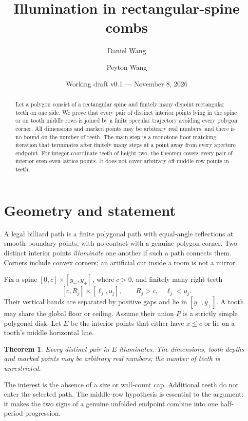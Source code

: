 \documentclass[11pt]{article}
\title{Illumination in rectangular-spine combs}
\author{Daniel Wang \and Peyton Wang}
\date{Working draft v0.1 --- November 8, 2026}
\newtheorem{theorem}{Theorem}[section]
\theoremstyle{definition}
\begin{document}
\maketitle
\begin{abstract}
Let a polygon consist of a rectangular spine and finitely many disjoint rectangular teeth on one side. We prove that every pair of distinct interior points lying in the spine or on tooth middle rows is joined by a finite specular trajectory avoiding every polygon corner. All dimensions and marked points may be arbitrary real numbers, and there is no bound on the number of teeth. The main step is a monotone floor-matching iteration that terminates after finitely many steps at a point away from every aperture endpoint. For integer-coordinate teeth of height two, the theorem covers every pair of interior even-even lattice points. It does not cover arbitrary off-middle-row points in teeth.
\end{abstract}

\section{Geometry and statement}
A legal billiard path is a finite polygonal path with equal-angle reflections at smooth boundary points, with no contact with a genuine polygon corner. Two distinct interior points \emph{illuminate} one another if such a path connects them. Corners include convex corners; an artificial cut inside a room is not a mirror.

Fix a spine $[0,c]\times[y_-,y_+]$, where $c>0$, and finitely many right teeth
\[
 [c,R_j]\times[\ell_j,u_j],\qquad R_j>c,\quad \ell_j<u_j.
\]
Their vertical bands are separated by positive gaps and lie in $[y_-,y_+]$. A tooth may share the global floor or ceiling. Assume their union $P$ is a strictly simple polygonal disk. Let $E$ be the interior points that either have $x\le c$ or lie on a tooth's middle horizontal line.

\begin{theorem}\label{thm:comb}
Every distinct pair in $E$ illuminates. The dimensions, tooth depths and marked points may be arbitrary real numbers; the number of teeth is unrestricted.
\end{theorem}

The interest is the absence of a size or wall-count cap. Additional teeth do not enter the selected path. The middle-row hypothesis is essential to the argument: it makes the two signs of a genuine unfolded endpoint combine into one half-period progression.
\end{document}
